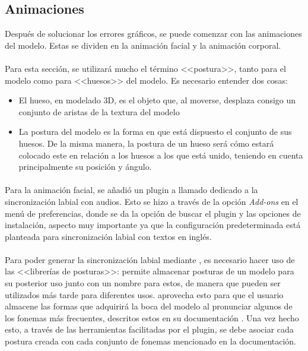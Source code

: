 \documentclass{subfiles}
\begin{document}
    \subsection{Animaciones}
    \label{sec:animaciones}
    Después de solucionar los errores gráficos, se puede comenzar con las animaciones del modelo. Estas se dividen en la animación facial y la animación corporal.

    \paragraph{}
    Para esta sección, se utilizará mucho el término <<postura>>, tanto para el modelo como para <<huesos>> del modelo. Es necesario entender dos cosas:
    \begin{itemize}
        \item El hueso, en modelado 3D, es el objeto que, al moverse, desplaza consigo un conjunto de aristas de la textura del modelo
        \item La postura del modelo es la forma en que está dispuesto el conjunto de sus huesos. De la misma manera, la postura de un hueso será cómo estará colocado este en relación a los huesos a los que está unido, teniendo en cuenta principalmente su posición y ángulo.
    \end{itemize}

    \paragraph{}
    Para la animación facial, se añadió un plugin a \blender llamado \rhubarb \cite{web:rhubarb} dedicado a la sincronización labial con audios. Esto se hizo a través de la opción \textit{Add-ons} en el menú de preferencias, donde se da la opción de buscar el plugin y las opciones de instalación, aspecto muy importante ya que la configuración predeterminada está planteada para sincronización labial con textos en inglés.

    \paragraph{}
    Para poder generar la sincronización labial mediante \rhubarb, es necesario hacer uso de las <<librerías de posturas>>: \blender permite almacenar posturas de un modelo para su posterior uso junto con un nombre para estos, de manera que pueden ser utilizados más tarde para diferentes usos. \rhubarb aprovecha esto para que el usuario almacene las formas que adquirirá la boca del modelo al pronunciar algunos de los fonemas más frecuentes, descritos estos en su documentación \cite{web:rhubarb_mouthshapes}. Una vez hecho esto, a través de las herramientas facilitadas por el plugin, se debe asociar cada postura creada con cada conjunto de fonemas mencionado en la documentación.
\end{document}
